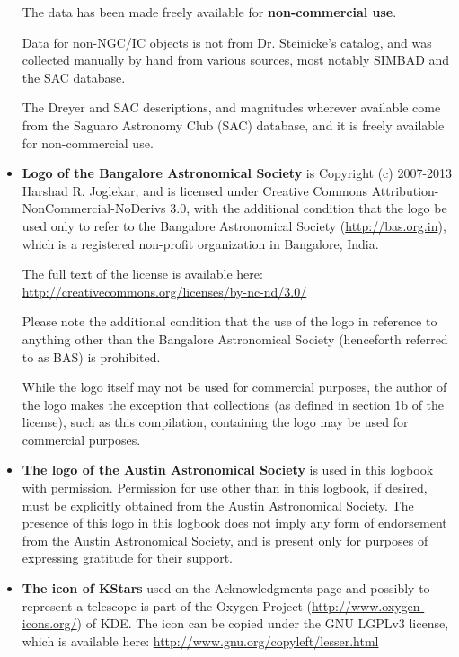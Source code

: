 \begin{itemize}
  The data has been made freely available for \textbf{non-commercial
    use}.

  Data for non-NGC/IC objects is not from Dr. Steinicke's catalog, and
  was collected manually by hand from various sources, most notably
  SIMBAD and the SAC database.

  The Dreyer and SAC descriptions, and magnitudes wherever available
  come from the Saguaro Astronomy Club (SAC) database, and it is
  freely available for non-commercial use.

\item \textbf{Logo of the Bangalore Astronomical Society} is Copyright
  (c) 2007-2013 Harshad R. Joglekar, and is licensed under Creative
  Commons Attribution-NonCommercial-NoDerivs 3.0, with the additional
  condition that the logo be used only to refer to the Bangalore
  Astronomical Society (\url{http://bas.org.in}), which is a
  registered non-profit organization in Bangalore, India. 

  The full text of the license is available here:
  \url{http://creativecommons.org/licenses/by-nc-nd/3.0/}

  Please note the additional condition that the use of the logo in
  reference to anything other than the Bangalore Astronomical Society
  (henceforth referred to as BAS) is prohibited.

  While the logo itself may not be used for commercial purposes, the
  author of the logo makes the exception that collections (as defined
  in section 1b of the license), such as this compilation, containing
  the logo may be used for commercial purposes.

\item \textbf{The logo of the Austin Astronomical Society} is used in
  this logbook with permission. Permission for use other than in this
  logbook, if desired, must be explicitly obtained from the Austin
  Astronomical Society. The presence of this logo in this logbook does
  not imply any form of endorsement from the Austin Astronomical
  Society, and is present only for purposes of expressing gratitude
  for their support.

\item \textbf{The icon of KStars} used on the Acknowledgments page
  and possibly to represent a telescope is part of the Oxygen Project
  (\url{http://www.oxygen-icons.org/}) of KDE. The icon can be copied
  under the GNU LGPLv3 license, which is available here:
  \url{http://www.gnu.org/copyleft/lesser.html}


\end{itemize}
